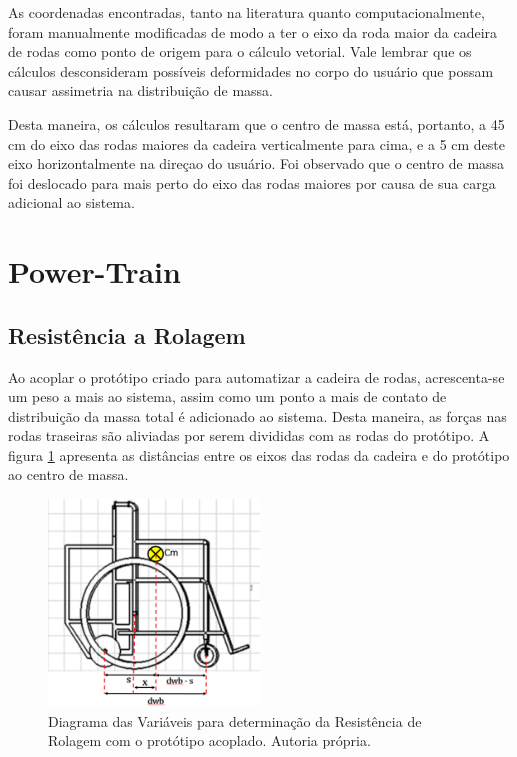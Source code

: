 As coordenadas encontradas, tanto na literatura quanto computacionalmente, foram manualmente modificadas de modo a ter o eixo da roda maior da cadeira de rodas como ponto de origem para o cálculo vetorial. Vale lembrar que os cálculos desconsideram possíveis deformidades no corpo do usuário que possam causar assimetria na distribuição de massa.

Desta maneira, os cálculos resultaram que o centro de massa está, portanto, a 45 cm do eixo das rodas maiores da cadeira verticalmente para cima, e a 5 cm deste eixo horizontalmente na direçao do usuário. Foi observado que o centro de massa foi deslocado para mais perto do eixo das rodas maiores por causa de sua carga adicional ao sistema.

\section{Power-Train}

\subsection[Resistência a Rolagem]{Resistência a Rolagem}

Ao acoplar o protótipo criado para automatizar a cadeira de rodas, acrescenta-se um peso a mais ao sistema, assim como um ponto a mais de contato de distribuição da massa total é adicionado ao sistema. Desta maneira, as forças nas rodas traseiras são aliviadas por serem divididas com as rodas do protótipo. A figura \ref{fig:finalmente_essa_imagem} apresenta as distâncias entre os eixos das rodas da cadeira e do protótipo ao centro de massa.

\begin{figure}[!htb]
	\centering
	\includegraphics[width = 0.5\textwidth]{figuras/resultados/finalmente_essa_imagem}
	\caption{Diagrama das Variáveis para determinação da Resistência de Rolagem com o protótipo acoplado. Autoria própria.}
	\label{fig:finalmente_essa_imagem}
\end{figure}


